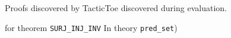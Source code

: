 \documentclass[runningheads,a4paper,draft]{svjour3}
\def\holyhammer{\textsf{HOL(y)Hammer}\xspace}
\def\tactictoe{\textsf{TacticToe}\xspace}
\begin{document}







\newcommand{\wed}{\begin{math}\wedge\end{math}}

Proofs discovered by \tactictoe discovered during evaluation.




for theorem \texttt{SURJ\_INJ\_INV} In 
theory \texttt{pred\_set})
\end{document}
